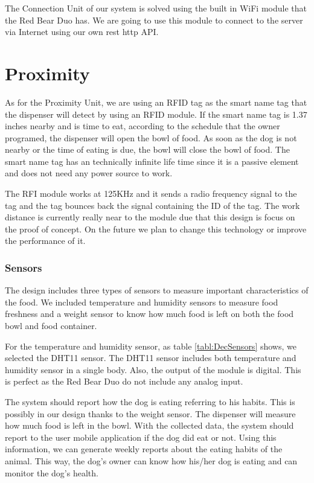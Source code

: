 \documentclass[12pt]{article}
\begin{document}
The Connection Unit of our system is solved using the built in WiFi module that the Red Bear Duo has. We are going to use this module to connect to the server via Internet using our own rest http API.

\section{Proximity} %
\label{sec:proximity}

As for the Proximity Unit, we are using an RFID tag\cite{K2014} as the smart name tag that the dispenser will detect by using an RFID module. If the smart name tag is 1.37 inches nearby and is time to eat, according to the schedule that the owner programed, the dispenser will open the bowl of food. As soon as the dog is not nearby or the time of eating is due, the bowl will close the bowl of food. The smart name tag has an technically infinite life time since it is a passive element and does not need any power source to work.

The RFI module works at 125KHz and it sends a radio frequency signal to the tag and the tag bounces back the signal containing the ID of the tag. The work distance is currently really near to the module due that this design is focus on the proof of concept. On the future we plan to change this technology or improve the performance of it.



\subsubsection{Sensors}

The design includes three types of sensors to measure important characteristics of the food. We included temperature and humidity sensors to measure food freshness and a weight sensor to know how much food is left on both the food bowl and food container.

For the temperature and humidity sensor, as table \ref{tabl:DecSensors} shows, we selected the DHT11 sensor. The DHT11 sensor includes both temperature and humidity sensor in a single body. Also, the output of the module is digital. This is perfect as the Red Bear Duo do not include any analog input.

The system should report how the dog is eating referring to his habits. This is possibly in our design thanks to the weight sensor. The dispenser will measure how much food is left in the bowl. With the collected data, the system should report to the user mobile application if the dog did eat or not. Using this information, we can generate weekly reports about the eating habits of the animal. This way, the dog's owner can know how his/her dog is eating and can monitor the dog's health.
\end{document}
